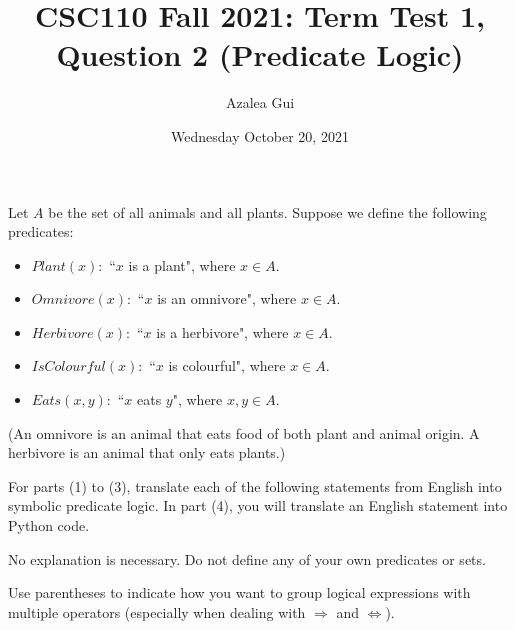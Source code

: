 \documentclass{article}
\title{CSC110 Fall 2021: Term Test 1, Question 2 (Predicate Logic)}
\author{Azalea Gui}
\date{Wednesday October 20, 2021}
\begin{document}
\maketitle

Let $A$ be the set of all animals and all plants.
Suppose we define the following predicates:

\begin{itemize}
    \item $Plant(x):$ ``$x$ is a plant", where $x \in A$.
    \item $Omnivore(x):$ ``$x$ is an omnivore", where $x \in A$.
    \item $Herbivore(x):$ ``$x$ is a herbivore", where $x \in A$.
    \item $IsColourful(x):$ ``$x$ is colourful", where $x \in A$.
    \item $Eats(x, y):$ ``$x$ eats $y$", where $x, y \in A$.
\end{itemize}
(An omnivore is an animal that eats food of both plant and animal origin.
A herbivore is an animal that only eats plants.)

For parts (1) to (3), translate each of the following statements from English into symbolic predicate logic.
In part (4), you will translate an English statement into Python code.

No explanation is necessary.
Do not define any of your own predicates or sets.

Use parentheses to indicate how you want to group logical expressions with multiple operators (especially when dealing with $\Rightarrow$ and $\Leftrightarrow$).
\end{document}
